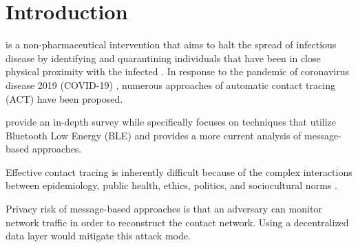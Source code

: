 \chapter{Introduction}

 is a non-pharmaceutical intervention that aims to halt the spread of infectious disease by identifying and quarantining individuals that have been in close physical proximity with the infected \citep{Brandt2022, PozoMartin2023}. In response to the pandemic of coronavirus disease 2019 (COVID-19) \citep{Zhu2020, Gorbalenya2020, Singh2021}, numerous approaches of automatic contact tracing (ACT) have been proposed. 

\citet{Shubina2020} provide an in-depth survey while \citet{Reichert2021} specifically focuses on techniques that utilize Bluetooth Low Energy (BLE) and provides a more current analysis of message-based approaches.



Effective contact tracing is inherently difficult because of the complex interactions between epidemiology, public health, ethics, politics, and sociocultural norms \citep{Brandt2022}.


Privacy risk of message-based approaches is that an adversary can monitor network traffic in order to reconstruct the contact network. Using a decentralized data layer would mitigate this attack mode.


